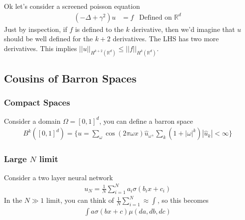 Ok let's consider a screened poisson equation
\begin{align}
	(-\Delta + \gamma^2) u & = f & \text{Defined on } \mathbb R^d
\end{align}
Just by inspection, if $f$ is defined to the $k$ derivative, then we'd imagine that $u$ should be well defined for the $k+2$ derivatives. The LHS has two more derivatives. This implies $||u||_{H^{k+2}(\mathbb R^d)} \leq ||f||_{H^k(\mathbb R^d)}$.

\subsection{Cousins of Barron Spaces}
\subsubsection{Compact Spaces}
Consider a domain $\Omega = [0,1]^d$, you can define a barron space 
\begin{align}
	B^k([0,1]^d) = \{u= \sum_\omega \cos(2\pi \omega x) \hat u_\omega, \sum_k (1 + |\omega|^k ) |\hat u_k|< \infty\}
\end{align}

\subsubsection{Large $N$ limit}
Consider a two layer neural network
\begin{align}
	u_N = \frac{1}{N} \sum_{i=1}^N a_i \sigma(b_i x +c_i)
\end{align}
In the $N \gg 1$ limit, you can think of $\frac{1}{N} \sum_{i=1}^N \approx \int$, so this becomes
\begin{align}
	\int a\sigma(b x + c) \mu(da, db, dc)
\end{align}

